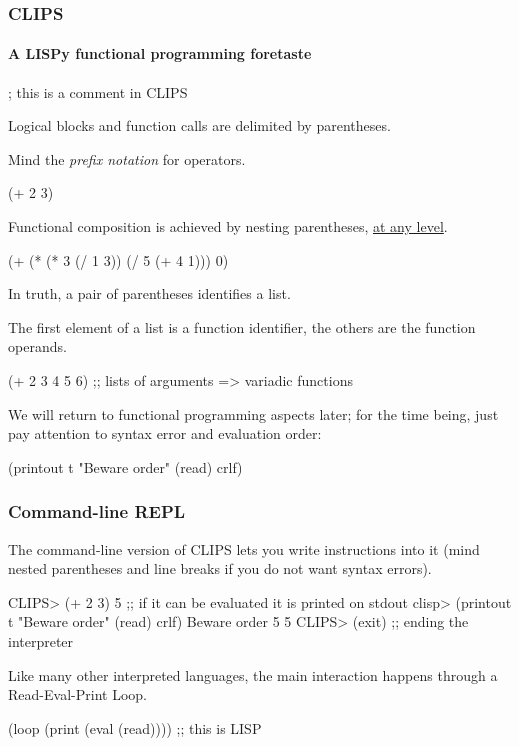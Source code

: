 \documentclass[xcolor={usenames,dvipsnames,svgnames}, compress]{beamer}
\begin{document}
\begin{frame}[fragile]
  \frametitle{CLIPS}
  \framesubtitle{A LISPy functional programming foretaste}
  \begin{clips-code}[numbers=none]
    ; this is a comment in CLIPS
  \end{clips-code}
  Logical blocks and function calls are delimited by parentheses.\par
  Mind the \emph{prefix notation} for operators.
  \begin{clips-code}[numbers=none]
    (+ 2 3)
  \end{clips-code}
  
  Functional composition is achieved by nesting parentheses, \href{http://c2.com/cgi/wiki?LostInaSeaofParentheses}{at any
  level}. 
  \begin{clips-code}[numbers=none]
    (+ (* (* 3 (/ 1 3)) (/ 5 (+ 4 1))) 0)
  \end{clips-code}
  In truth, a pair of parentheses identifies a list.\par
  The first element of a list is a function identifier, the others are
  the function operands.\par
  
  \begin{clips-code}[numbers=none]
    (+ 2 3 4 5 6) ;; lists of arguments => variadic functions
  \end{clips-code}

  We will return to functional programming aspects later; for the time
  being, just pay attention to syntax error and evaluation order:
  \begin{clips-code}[numbers=none]
    (printout t "Beware order" (read) crlf)
  \end{clips-code}
\end{frame}

\begin{frame}[fragile]
  \frametitle{Command-line REPL}
  
  The command-line version of CLIPS lets you write instructions into
  it (mind nested parentheses and line breaks if you do not want syntax errors).
  \begin{clips-code}[numbers=none]
    CLIPS> (+ 2 3)
    5 ;; if it can be evaluated it is printed on stdout
    clisp> (printout t "Beware order" (read) crlf)
    Beware order  5
    5
    CLIPS> (exit) ;; ending the interpreter
  \end{clips-code}\bigskip
  
  Like many other interpreted languages, the main interaction happens through a \textsf{R}ead-\textsf{E}val-\textsf{P}rint
  \textsf{L}oop.
  \begin{clips-code}[numbers=none]
    (loop (print (eval (read)))) ;; this is LISP
  \end{clips-code}
  
  
\end{frame}
\end{document}
